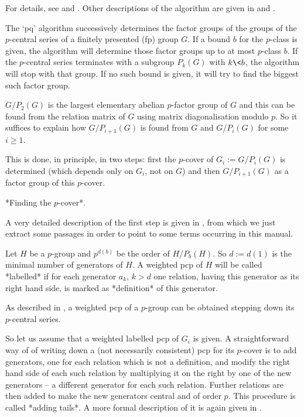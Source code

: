 
For details, see \cite{HN80} and \cite{NO96}. Other descriptions of the
algorithm are given in \cite{VL90b} and \cite{Sims94}.

The `pq' algorithm successively determines the factor  groups  of  the
groups of the $p$-central series of a finitely  presented  (fp)  group
$G$. If a bound $b$ for the $p$-class is  given,  the  algorithm  will
determine those factor groups up to at  most  $p$-class  $b$.  If  the
$p$-central series terminates with a subgroup $P_k(G)$ with $k \<  b$,
the algorithm will stop with that group. If no such bound is given, it
will try to find the biggest such factor group.

$G/P_2(G)$ is  the largest elementary abelian $p$-factor  group of $G$
and this  can be found  from the relation  matrix of $G$  using matrix
diagonalisation   modulo  $p$.   So   it  suffices   to  explain   how
$G/P_{i+1}(G)$ is found from $G$ and $G/P_i(G)$ for some $i \ge 1$.

This  is  done, in  principle,  in  two  steps:  first  the  $p$-cover
of $G_i := G/P_i(G)$ is determined (which depends only on
$G_i$, not on  $G$) and then $G/P_{i+1}(G)$ as a  factor group of this
$p$-cover.

*Finding the $p$-cover*.

A very detailed description of  the first step is given in \cite{NNN98},
from which  we just extract  some passages in  order to point  to some
terms occurring in this manual.

Let $H$ be a $p$-group and  $p^{d(b)}$ be the order of $H/P_b(H)$.  So
$d :=  d(1)$ is the minimal  number of generators of  $H$.  A weighted
pcp of $H$ will be  called *labelled* if for each generator $a_k$,
$k > d$  one relation, having this generator as  its right hand side,
is marked as *definition* of this generator.

As described  in \cite{NNN98}, a  weighted pcp   of a $p$-group  can be
obtained stepping down its $p$-central series.

So let  us assume that a weighted  labelled pcp of $G_i$  is given.  A
straightforward way of of writing down a (not necessarily consistent)
pcp  for its $p$-cover  is to  add generators,  one for  each relation
which is not a definition, and modify the right hand side of each such
relation by multiplying it on the right by one of the new generators --
a different  generator for each  such relation. Further  relations are
then added  to make the new  generators central and of  order $p$.  This
procedure is called  *adding tails*.  A more formal  description of it
is again given in \cite{NNN98}.

